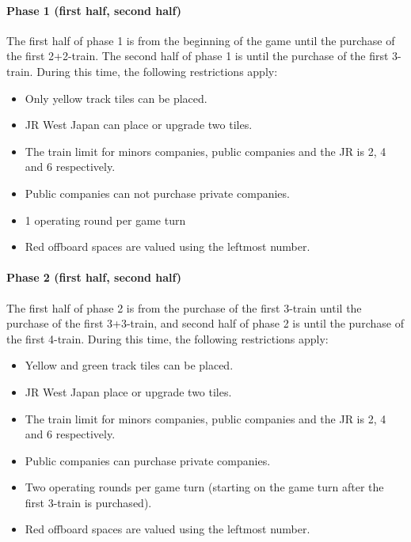 \documentclass{article}
\begin{document}
\begin{CJK}{UTF8}{min}
\begin{multicols}{2}
\paragraph*{Phase 1 (first half, second half)}
The first half of phase 1 is from the beginning of the game until
the purchase of the first 2+2-train. The second half of phase 1 is
until the purchase of the first 3-train. During this time, the
following restrictions apply:
\begin{itemize}
\item Only yellow track tiles can be placed.
\item JR West Japan can place or upgrade two tiles.
\item The train limit for minors companies, public companies and the JR is
  2, 4 and 6 respectively.
\item Public companies can not purchase private companies.
\item 1 operating round per game turn
\item Red offboard spaces are valued using the leftmost number.
\end{itemize}

\paragraph*{Phase 2 (first half, second half)}
The first half of phase 2 is from the purchase of the first 3-train
until the purchase of the first 3+3-train, and second half of phase 2
is until the purchase of the first 4-train. During this time, the
following restrictions apply:
\begin{itemize}
\item Yellow and green track tiles can be placed.
\item JR West Japan place or upgrade two tiles.
\item The train limit for minors companies, public companies and the JR is
  2, 4 and 6 respectively.
\item Public companies can purchase private companies.
\item Two operating rounds per game turn (starting on the game turn after
  the first 3-train is purchased).
\item Red offboard spaces are valued using the leftmost number.
\end{itemize}


\end{multicols}
\end{CJK}
\end{document}
